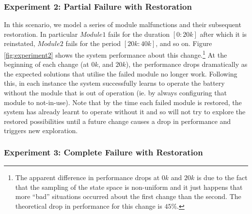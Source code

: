 %

\subsubsection{Experiment 2: Partial Failure with Restoration}

In this scenario, we model a series of module malfunctions and their subsequent restoration. In particular $Module1$ fails for the duration $[0:20k]$ after which it is reinstated, $Module2$ fails for the period $[20k:40k]$, and so on. Figure \ref{fig:experiment2} shows the system performance about this change.\footnote{The apparent difference in performance drops at $0k$ and $20k$ is due to the fact that the sampling of the state space is non-uniform and it just happens that more ``bad'' situations occurred about the first change than the second. The theoretical drop in performance for this change is $45\%$.} At the beginning of each change (at $0k$, and $20k$), the performance drops dramatically as the expected solutions that utilise the failed module no longer work. Following this, in each instance the system successfully learns to operate the battery without the module that is out of operation (ie. by always configuring that module to not-in-use). Note that by the time each failed module is restored, the system has already learnt to operate without it and so will not try to explore the restored possibilities until a future change causes a drop in performance and triggers new exploration.


%

\subsubsection{Experiment 3: Complete Failure with Restoration}

